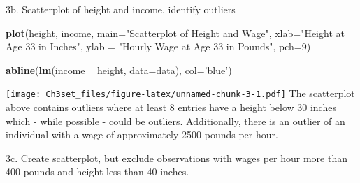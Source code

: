 \documentclass[]{article}
\newenvironment{Shaded}{\begin{snugshade}}{\end{snugshade}}
\newcommand{\KeywordTok}[1]{\textcolor[rgb]{0.13,0.29,0.53}{\textbf{#1}}}
\newcommand{\DataTypeTok}[1]{\textcolor[rgb]{0.13,0.29,0.53}{#1}}
\newcommand{\DecValTok}[1]{\textcolor[rgb]{0.00,0.00,0.81}{#1}}
\newcommand{\StringTok}[1]{\textcolor[rgb]{0.31,0.60,0.02}{#1}}
\newcommand{\CommentTok}[1]{\textcolor[rgb]{0.56,0.35,0.01}{\textit{#1}}}
\newcommand{\OperatorTok}[1]{\textcolor[rgb]{0.81,0.36,0.00}{\textbf{#1}}}
\newcommand{\NormalTok}[1]{#1}
\begin{document}
3b. Scatterplot of height and income, identify outliers

\begin{Shaded}
\begin{Highlighting}[]
\KeywordTok{plot}\NormalTok{(height, income, }\DataTypeTok{main=}\StringTok{"Scatterplot of Height and Wage"}\NormalTok{,}
     \DataTypeTok{xlab=}\StringTok{"Height at Age 33 in Inches"}\NormalTok{, }\DataTypeTok{ylab =} \StringTok{"Hourly Wage at Age 33 in Pounds"}\NormalTok{, }\DataTypeTok{pch=}\DecValTok{9}\NormalTok{)}

\KeywordTok{abline}\NormalTok{(}\KeywordTok{lm}\NormalTok{(income }\OperatorTok{~}\StringTok{ }\NormalTok{height, }\DataTypeTok{data=}\NormalTok{data), }\DataTypeTok{col=}\StringTok{'blue'}\NormalTok{)}
\end{Highlighting}
\end{Shaded}

\texttt{[image: Ch3set\_files/figure-latex/unnamed-chunk-3-1.pdf]} The
scatterplot above contains outliers where at least 8 entries have a
height below 30 inches which - while possible - could be outliers.
Additionally, there is an outlier of an individual with a wage of
approximately 2500 pounds per hour.

3c. Create scatterplot, but exclude observations with wages per hour
more than 400 pounds and height less than 40 inches.

\begin{Shaded}
\end{Shaded}
\end{document}
